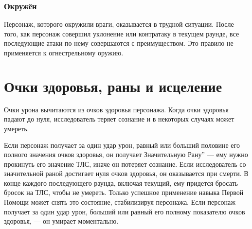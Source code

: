\documentclass[letterpaper,twocolumn,openany, twoside, 11pt, usenames]{cocbook}
\begin{document}
\smallbreak
\noindent {}

\subsubsection*{Окружён}

Персонаж, которого окружили враги, оказывается в трудной ситуации. После того, как персонаж совершил уклонение или контратаку в текущем раунде, все последующие атаки по нему совершаются с преимуществом. Это правило не применяется к огнестрельному оружию.

\smallbreak
\noindent {}

\section*{Очки здоровья, раны и исцеление}

Очки урона вычитаются из очков здоровья персонажа. Когда очки здоровья падают до нуля, исследователь теряет сознание и в некоторых случаях может умереть.

Если персонаж получает за один удар урон, равный или больший половине его полного значения очков здоровья, он получает Значительную Рану'' --- ему нужно прокинуть его значение ТЛС, иначе он потеряет сознание. Если исследователь со значительной раной достигает нуля очков здоровья, он оказывается при смерти. В конце каждого последующего раунда, включая текущий, ему придется бросать бросок на ТЛС, чтобы не умереть. Только успешное применение навыка Первой Помощи может снять это состояние, стабилизируя персонажа. Если персонаж получает за один удар урон, больший или равный его полному показателю очков здоровья, --- он умирает моментально.
\end{document}
